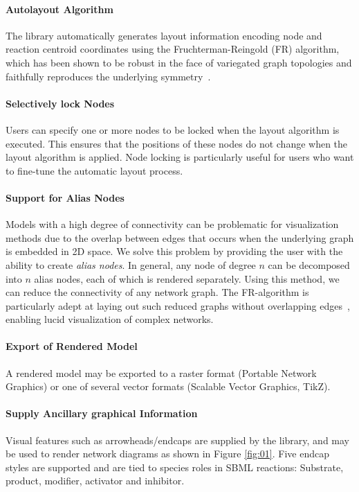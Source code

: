 \documentclass{bioinfo}
\begin{document}
\paragraph{Autolayout Algorithm}
The library automatically generates layout information encoding node and reaction centroid coordinates using the Fruch\-terman-Reingold (FR) algorithm, which has been shown to be robust in the face of variegated graph topologies and faithfully reproduces the underlying symm\-etry~\citep{FruchtermanReingold}. 

\paragraph{Selectively lock Nodes} Users can specify one or more nodes to be locked when the layout algorithm is executed. This ensures that the positions of these nodes do not change when the layout algorithm is applied.
Node locking is particularly useful for users who want to fine-tune the automatic layout process.

\paragraph{Support for Alias Nodes}
Models with a high degree of connectivity can be problematic for visualization
methods due to the overlap between edges that occurs when the underlying 
graph is embedded in 2D space.
We solve this problem by providing the user
with the ability to create \textit{alias nodes}. In general, any node of degree
$n$ can be decomposed into $n$ alias nodes, each of which is rendered separately.
Using this method, we can reduce the connectivity of any network graph.
The FR-algorithm is particularly adept at laying out such reduced graphs without overlapping edges~\citep{FruchtermanReingold}, 
enabling lucid visualization of complex networks.

\paragraph{Export of Rendered Model}
A rendered model may be exported to a raster format (Portable Network Graphics) or one of several vector formats (Scalable Vector Graphics, TikZ). 

\paragraph{Supply Ancillary graphical Information}
Visual features such as arrowheads/endcaps are supplied by the library, and may be used to render network diagrams as shown in Figure \ref{fig:01}. Five endcap styles are supported and are tied to species roles in SBML reactions: Substrate, product, modifier, activator and inhibitor. 
\end{document}
